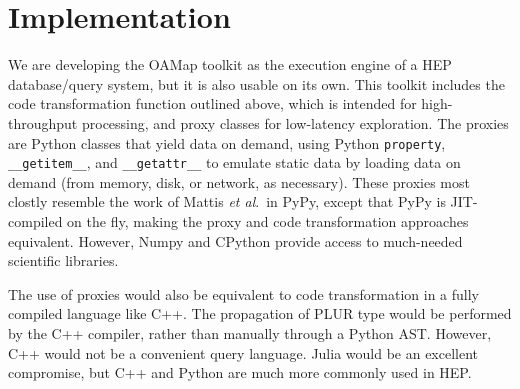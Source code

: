 \documentclass[10pt, conference, compsocconf]{IEEEtran}
\begin{document}



\section{Implementation}

We are developing the OAMap toolkit\cite{oamap} as the execution engine of a HEP database/query system, but it is also usable on its own. This toolkit includes the code transformation function outlined above, which is intended for high-throughput processing, and proxy classes for low-latency exploration. The proxies are Python classes that yield data on demand, using Python {\tt property}, {\tt \_\_getitem\_\_}, and {\tt \_\_getattr\_\_} to emulate static data by loading data on demand (from memory, disk, or network, as necessary). These proxies most clostly resemble the work of Mattis {\it et al}.\ in PyPy\cite{columnarobjects}, except that PyPy is JIT-compiled on the fly, making the proxy and code transformation approaches equivalent. However, Numpy and CPython provide access to much-needed scientific libraries.

The use of proxies would also be equivalent to code transformation in a fully compiled language like C++. The propagation of PLUR type would be performed by the C++ compiler, rather than manually through a Python AST. However, C++ would not be a convenient query language. Julia would be an excellent compromise, but C++ and Python are much more commonly used in HEP.
\end{document}

